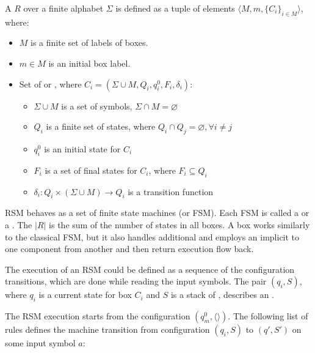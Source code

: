 \begin{definition}
A  $R$ over a finite alphabet $\Sigma$ is defined as a tuple of elements $\langle M,m,\{C_i\}_{i \in M} \rangle$, where:

\begin{itemize}
    \item $M$ is a finite set of labels of boxes.
    \item $m \in M$ is an initial box label.
    \item Set of  or ,
          where $C_i=(\Sigma \cup M, Q_i,q_i^0,F_i,\delta_i)$:
    \begin{itemize}
        \item $\Sigma \cup M$ is a set of symbols, $\Sigma \cap M = \varnothing$
        \item $Q_i$ is a finite set of states,
              where $Q_i \cap Q_j =  \varnothing, \forall i \neq j$
        \item $q_i^0$ is an initial state for $C_i$
        \item $F_i$ is a set of final states for $C_i$, where $F_i \subseteq Q_i$
        \item $\delta_i: Q_i \times (\Sigma \cup M) \to Q_i$ is a transition function %
    \end{itemize}
\end{itemize}

\end{definition}

RSM behaves as a set of finite state machines (or FSM).
Each FSM is called a  or a . 
The  $|R|$ is the sum of the number of states in all boxes. 
A box works similarly to the classical FSM, but it also handles additional  and employs an implicit  to  one component from another and then return execution flow back.

The execution of an RSM could be defined as a sequence of the configuration transitions, which are done while reading the input symbols.
The pair $(q_i,S)$, where $q_i$ is a current state for box $C_i$ and $S$ is  a stack of , describes an .

The RSM execution starts from the configuration $(q_m^0, \langle\rangle)$.
The following list of rules defines the machine transition from configuration $(q_i,S)$ to $(q',S')$ on some input symbol $a$:

